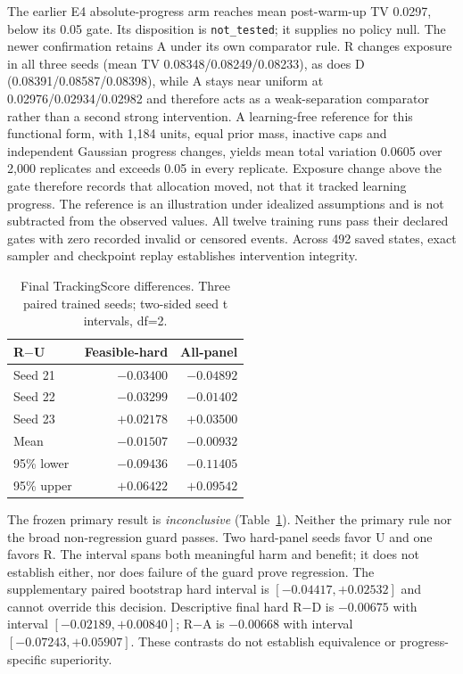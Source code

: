 \documentclass[letterpaper,10pt,conference]{ieeeconf}
\begin{document}
The earlier E4 absolute-progress arm reaches mean post-warm-up TV 0.0297, below its
0.05 gate. Its disposition is \texttt{not\_tested}; it supplies no policy null.
The newer confirmation retains A under its own comparator rule. R changes exposure
in all three seeds (mean TV 0.08348/0.08249/0.08233), as does D
(0.08391/0.08587/0.08398), while A stays near uniform at 0.02976/0.02934/0.02982 and therefore
acts as a weak-separation comparator rather than a second strong intervention.
A learning-free reference for this functional form, with 1,184 units, equal prior mass, inactive
caps and independent Gaussian progress changes, yields mean total variation 0.0605 over 2,000
replicates and exceeds 0.05 in every replicate. Exposure change above the gate therefore records
that allocation moved, not that it tracked learning progress. The reference is an illustration
under idealized assumptions and is not subtracted from the observed values.
All twelve training runs pass their declared gates with
zero recorded invalid or censored events. Across 492 saved states, exact sampler
and checkpoint replay establishes intervention integrity.

\begin{table}[t]
\centering
\caption{Final TrackingScore differences. Three paired trained seeds;
two-sided seed t intervals, df=2.}
\label{tab:confirmation}
\begin{tabular}{lrr}
\toprule
R$-$U & Feasible-hard & All-panel \\
\midrule
Seed 21 & $-0.03400$ & $-0.04892$ \\
Seed 22 & $-0.03299$ & $-0.01402$ \\
Seed 23 & $+0.02178$ & $+0.03500$ \\
Mean & $-0.01507$ & $-0.00932$ \\
95\% lower & $-0.09436$ & $-0.11405$ \\
95\% upper & $+0.06422$ & $+0.09542$ \\
\bottomrule
\end{tabular}
\end{table}

The frozen primary result is \emph{inconclusive} (Table~\ref{tab:confirmation}). Neither
the primary rule nor the broad non-regression guard passes. Two hard-panel seeds favor U
and one favors R. The interval spans both meaningful harm and benefit; it does not establish
either, nor does failure of the guard prove regression. The supplementary paired bootstrap
hard interval is $[-0.04417,+0.02532]$ and cannot override this decision.
Descriptive final hard R$-$D is $-0.00675$ with interval $[-0.02189,+0.00840]$;
R$-$A is $-0.00668$ with interval $[-0.07243,+0.05907]$. These contrasts do not
establish equivalence or progress-specific superiority.
\end{document}
